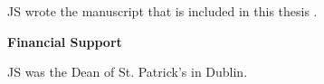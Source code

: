 

\label{contrib}


JS wrote the manuscript that is included in this thesis \protect\cite{Swift1726:Gull}.
   

\begin{center}
\Large \textbf{Financial Support}
\end{center}

JS was the Dean of St. Patrick's in Dublin.

